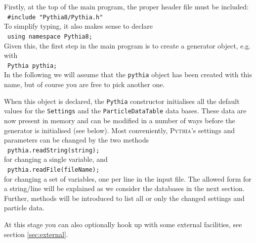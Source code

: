 \documentclass{elsartmod}
\newcommand{\cindent}{\hspace*{10mm}~}
\begin{document}
Firstly, at the top of the main program, the proper header file must
be included:\\
\cindent \texttt{\#include "Pythia8/Pythia.h"}\\
To simplify typing, it also makes sense to declare\\
\cindent \texttt{using namespace Pythia8;}\\ 
Given this, the first step in the main program is to create a 
generator object, e.g. with\\
\cindent \texttt{Pythia pythia;}\\
In the following we will assume that the \texttt{pythia} object
has been created with this name, but of course you are free to
pick another one.  

When this object is declared, 
the \texttt{Pythia} constructor initialises all
the default values for the \texttt{Settings} and the
\texttt{ParticleDataTable} data bases. These data are now present in
memory and can be modified in a number of ways before the generator is
initialised (see below). 
Most conveniently, \textsc{Pythia}'s settings and parameters can be
changed by the two methods\\
\cindent \texttt{pythia.readString(string);}\\
for changing a single variable, and\\
\cindent \texttt{pythia.readFile(fileName);}\\
for changing a set of variables, one per line in the input file. 
The allowed form for a string/line will be explained as we consider 
the databases in the next section. Further, methods will be introduced 
to list all or only the changed settings and particle data.

At this stage you can also optionally hook up with some external 
facilities, see section \ref{sec:external}.
\end{document}
